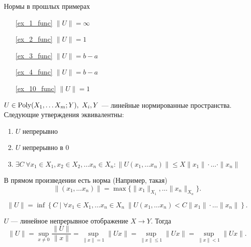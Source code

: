 \begin{ex}
    Нормы в прошлых примерах
    \begin{enumerate}
	\item[\ref{ex_1_func}] $ \| U \|  = \infty$
	\item[\ref{ex_2_func}] $ \| U \|  = 1$
	\item[\ref{ex_3_func}] $ \| U \| = b-a$
	\item[\ref{ex_4_func}] $ \| U \| = b-a$
	    \item[\ref{ex_10_func}] $ \| U \|  = 1$
    \end{enumerate}
\end{ex}
\begin{thm}
    $ U \in  {\mathop{\text{\rm Poly}}}(X_1, \ldots X_m; Y), ~ X_i, Y  $ --- линейные нормированные пространства. Следующие утверждения эквивалентны:
    \begin{enumerate}
        \item $ U$ непрерывно
	    \item  $ U$ непрерывно в $ 0$ 
	    \item  $ \exists  C ~ \forall  x_1 \in X_1, x_2 \in X_2, \ldots x_n \in X_n \colon \| U(x_1, \ldots x_n) \|  \le  X \| x_1 \| \cdot \ldots \cdot \| x_{n} \| $
    \end{enumerate}
    \begin{note}
	В прямом произведении есть норма (Например, такая) \[
	    \| (x_1, \ldots  x_{n})\| = \max \{\| x_1 \| _{X_1} , \ldots  \| x_{n} \| _{   X_n}\} 
        .\] 
    \end{note}
\end{thm}
\begin{defn}
    \[
	\| U \|  = \inf \left\{ C \mid \forall  x_1 \in X_1, \ldots x_{n} \in X_n ~ \|  U(x_1, \ldots x_{n}) < C \| x_1 \| \cdot \ldots \| x_{n} \|    \right\} 
    .\] 
\end{defn}
\begin{thm} 		
    $ U$ --- линейное непрерывное отображение $ X \to  Y$. Тогда
    \[
	\| U \| = \sup_{x\ne 0 }\frac{\| U \| }{\| x \| } = \sup_{\| x \| =1} \|  Ux \| = \sup_{\| x \|  \le 1} \| Ux \| = \sup_{\|  x \| < 1} \| Ux \|  
    .\] 
\end{thm}
